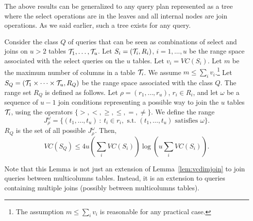 
The above results can be generalized to any query plan represented as a tree
where the select operations are in the leaves and all internal nodes are join
operations. As we said earlier, such a tree exists for any query.

\begin{lemma}\label{lem:vcdimmuljoin}
  Consider the class $Q$ of queries that can be seen as combinations of select
  and joins on $u>2$ tables ${\cal T}_1,\dots,{\cal T}_u$. Let $S_i=({\cal T}_i,R_i)$,
  $i=1,\dots,u$ be the range space associated with the select queries on the $u$
  tables. Let $v_i=VC(S_i)$. Let $m$ be the maximum number of columns in a table
  ${\cal T}_i$. We assume $m\le \sum_i v_i$.\footnote{The assumption $m\le \sum_i
  v_i$ is reasonable for any practical case.} Let $S_Q = ({\cal T}_1\times\dots\times
  {\cal T}_u, R_Q)$ be the range space associated with the class $Q$. The range set
  $R_Q$ is defined as follows. Let $\rho = (r_1,\dots,r_u)$, $r_i\in R_i$, and
  let $\omega$ be a sequence of
  $u-1$ join conditions representing a possible way to join the $u$ tables ${\cal T}_i$,
  using the operators $\{>,<,\ge,\le,=,\neq\}$. We define the range 
  \[
  J^\omega_{\rho} = \{(t_1,\dots,t_u) ~:~ t_i\in r_i, \mbox{ s.t. }
  (t_1,\dots,t_u) \mbox{ satisfies } \omega\}.\]
  $R_Q$ is the set of all possible $J^\omega_{\rho}$. Then,
  \[
  VC(S_Q)\leq 4u(\sum_i VC(S_i))\log(u\sum_i VC(S_i)).
  \]
\end{lemma}

Note that this Lemma is not just an extension of Lemma~\ref{lem:vcdimjoin}
to join queries between multicolumns tables. Instead, it is an extension to
queries containing multiple joins (possibly between multicolumns tables).

